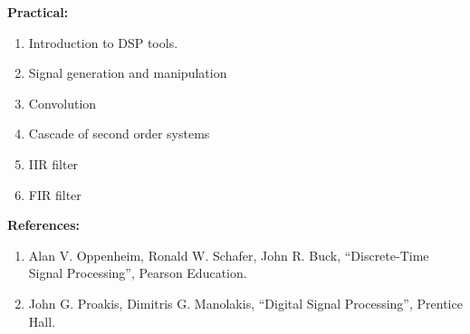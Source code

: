 \noindent \textbf{Practical:}
  \begin{enumerate}[label=\arabic*.]
    \item Introduction to DSP tools.
    \item Signal generation and manipulation
    \item Convolution
    \item Cascade of second order systems
    \item IIR filter
    \item FIR filter
  \end{enumerate}
  \Vs

\noindent \textbf{References:}
  \begin{enumerate}[label=\arabic*.]
    \item Alan V. Oppenheim, Ronald W. Schafer, John R. Buck, ``Discrete-Time Signal Processing'', Pearson Education.
    \item John G. Proakis, Dimitris G. Manolakis, ``Digital Signal Processing'', Prentice Hall.
  \end{enumerate}

\newpage

